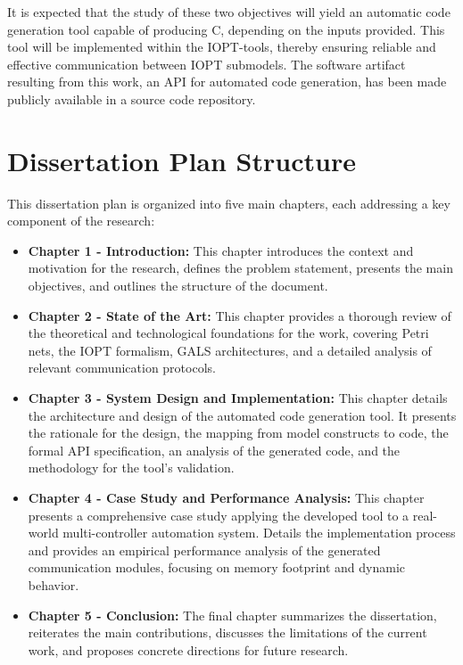 It is expected that the study of these two objectives will yield an automatic code generation tool capable of producing C, depending on the inputs provided. This tool will be implemented within the IOPT-tools, thereby ensuring reliable and effective communication between IOPT submodels.
The software artifact resulting from this work, an API for automated code generation, has been made publicly available in a source code repository.




\section{Dissertation Plan Structure}
\label{sec:dissertation_structure}


This dissertation plan is organized into five main chapters, each addressing a key component of the research:

\begin{itemize}
    \item \textbf{Chapter 1 - Introduction:} This chapter introduces the context and motivation for the research, defines the problem statement, presents the main objectives, and outlines the structure of the document.

    \item \textbf{Chapter 2 - State of the Art:} This chapter provides a thorough review of the theoretical and technological foundations for the work, covering Petri nets, the IOPT formalism, GALS architectures, and a detailed analysis of relevant communication protocols.

    \item \textbf{Chapter 3 - System Design and Implementation:} This chapter details the architecture and design of the automated code generation tool. It presents the rationale for the design, the mapping from model constructs to code, the formal API specification, an analysis of the generated code, and the methodology for the tool's validation.

    \item \textbf{Chapter 4 - Case Study and Performance Analysis:} This chapter presents a comprehensive case study applying the developed tool to a real-world multi-controller automation system. Details the implementation process and provides an empirical performance analysis of the generated communication modules, focusing on memory footprint and dynamic behavior.

    \item \textbf{Chapter 5 - Conclusion:} The final chapter summarizes the dissertation, reiterates the main contributions, discusses the limitations of the current work, and proposes concrete directions for future research.
\end{itemize}


